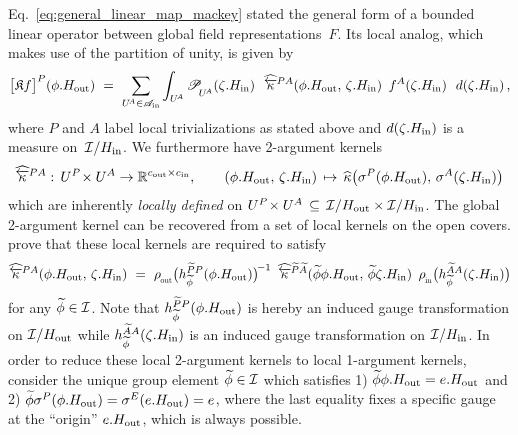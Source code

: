 Eq.~\eqref{eq:general_linear_map_mackey} stated the general form of a bounded linear operator between global field representations~$F$.
Its local analog, which makes use of the partition of unity, is given by
\begin{align}
    \big[ \mathfrak{K} f \big]^P (\phi.\Hout)\ =\ 
    \sum_{U^{\!A} \in \mathscr{A}_\textup{in}} \int_{U^{\!A}} \mathscr{P}_{\!\overset{}{U^{\!A}}} (\zeta.\Hin)\ \ 
        \widehat{\overleftarrow{\kappa}} \rule{0pt}{0pt}^{\mkern-1mu PA}(\phi.\Hout,\, \zeta.\Hin)\,\ 
        f^A (\zeta.\Hin)\ \ d(\zeta.\Hin) \,,
\end{align}
where $P$ and $A$ label local trivializations as stated above and $d(\zeta.H_{\textup{in}})$ is a measure on~$\mathcal{I}/H_{\textup{in}}$.
We furthermore have 2-argument kernels
\begin{align}
    \widehat{\overleftarrow{\kappa}} \rule{0pt}{0pt}^{\mkern-1mu PA}:\, U^P \!\times U^A \to \R^{\cout\times\cin}
    ,\qquad (\phi.\Hout,\, \zeta.\Hin) \,\mapsto\,
    \widehat{\kappa} \big( \sigma^P(\phi.\Hout),\, \sigma^A(\zeta.\Hin) \big)
\end{align}
which are inherently \emph{locally defined} on ${U^P \!\times U^A} \,\subseteq\, \mathcal{I}/H_{\textup{out}} \times \mathcal{I}/H_{\textup{in}}$.
The global 2-argument kernel can be recovered from a set of local kernels on the open covers.
\citet{Cohen2018-intertwiners}\cite{Cohen2019-generaltheory} prove that these local kernels are required to satisfy
\begin{align}\label{eq:intertwiner_constraint_local}
    \widehat{\overleftarrow{\kappa}} \rule{0pt}{0pt}^{\mkern-1mu PA}(\phi.\Hout,\, \zeta.\Hin)
    \ =\ 
    \rhoout\big( h_{\widetilde{\phi}}^{\widetilde{P}P} (\phi.\Hout) \big)^{\!-1}\,\ 
    \widehat{\overleftarrow{\kappa}} \rule{0pt}{0pt}^{\mkern-1mu \widetilde{P}\widetilde{A}}( \widetilde{\phi}\phi.\Hout,\, \widetilde{\phi}\zeta.\Hin)
    \,\ \rhoin\big( h_{\widetilde{\phi}}^{\widetilde{A}A} (\zeta.\Hin) \big)
\end{align}
for any $\widetilde{\phi} \in\mathcal{I}$.
Note that $h_{\widetilde{\phi}}^{\widetilde{P}P} (\phi.H_{\textup{out}})$ is hereby an induced gauge transformation on $\mathcal{I}/H_{\textup{out}}$ while $h_{\widetilde{\phi}}^{\widetilde{A}A} (\zeta.H_{\textup{in}})$ is an induced gauge transformation on $\mathcal{I}/H_{\textup{in}}$.
In order to reduce these local 2-argument kernels to local 1-argument kernels, \citet{Cohen2018-intertwiners}\cite{Cohen2019-generaltheory} consider the unique group element $\widetilde{\phi} \in\mathcal{I}$ which satisfies
1) $\widetilde{\phi} \phi.H_{\textup{out}} = e.H_{\textup{out}}$ and
2) $\widetilde{\phi} \sigma^P(\phi.H_{\textup{out}}) = \sigma^E(e.H_{\textup{out}}) = e$,
where the last equality fixes a specific gauge at the ``origin'' $e.H_{\textup{out}}$, which is always possible.
